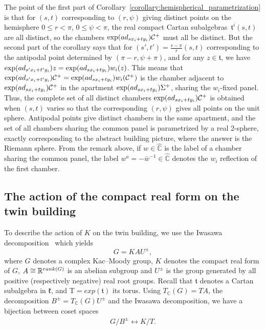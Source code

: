 \documentclass[11pt]{article}
\numberwithin{equation}{section}
\numberwithin{equation}{section}
\def\C{{\mathbb C}}
\def\cC{\mathcal C}
\def\k{\mathfrak{k}}
\def\ft{\mathfrak{t}}
\begin{document}
The point of the first part of Corollary~\ref{corollary:hemispherical_parametrization} is that for $(s,t)$ corresponding to $(r,\psi)$ giving distinct points on the hemisphere $0\leq r < \pi$, $0\leq\psi<\pi$, the real compact Cartan subalgebras~$\ft^i(s,t)$ are all distinct, so the chambers $\exp( {\rm ad}_{sx_i+ty_i}) \cC^+$ must all be distinct. But the second part of the corollary says that for $(s',t') = \frac{r-\pi}{r}(s,t)$ corresponding to the antipodal point determined by $(\pi-r,\psi+\pi)$,
and for any $z\in\ft$, we have $\exp( {\rm ad}_{s'x_i+t'y_i}) z = \exp( {\rm ad}_{sx_i+ty_i}) w_i(z)$. This means that $\exp( {\rm ad}_{s'x_i+t'y_i}) \cC^+ = \exp( {\rm ad}_{sx_i+ty_i}) w_i(\cC^+)$ is the chamber adjacent to $\exp( {\rm ad}_{sx_i+ty_i}) \cC^+$ in the apartment $\exp( {\rm ad}_{sx_i+ty_i}) \Sigma^+$, sharing the $w_i$-fixed panel. Thus, the complete set of all distinct
chambers $\exp( {\rm ad}_{sx_i+ty_i}) \cC^+$ is obtained when $(s,t)$ varies so that the corresponding $(r,\psi)$ gives all points on the unit sphere. Antipodal points give distinct chambers in the same apartment, and the set of all chambers sharing the common panel is parametrized by a real 2-sphere, exactly corresponding to the abstract building picture, where the answer is the Riemann sphere. From the remark above, if $w\in\hat\C$ is the label of a chamber sharing the common panel, the
label $w^a = -{\bar w}^{-1} \in\hat\C$ denotes the $w_i$ reflection of the first chamber.

\subsection{The action of the compact real form on the twin building}\label{subsection:action_of_compact_real_form}
To describe the action of $K$ on the twin building, we use the Iwasawa decomposition~\cite{deMedtsGramlichHorn09} which yields
\[G=KAU^{\pm},\]
where $G$ denotes a complex Kac--Moody group, $K$ denotes the compact real form of $G$, $A\cong \mathbb{R}^{{\rm rank}(G)}$ is an abelian subgroup and $U^{\pm}$ is the group generated by all positive (respectively negative) real root groups. Recall that $\ft$ denotes
a Cartan subalgebra in $\k$, and T$=exp(\ft)$ its torus. Using $T_\C(G) = TA$, the decomposition $B^{\pm}=T_\C(G) U^{\pm}$ and the Iwasawa decomposition, we have a bijection between coset spaces
 \begin{gather}\label{equation:GB=KT}
 G/B^{\pm} \leftrightarrow K/T.
 \end{gather}
\end{document}
